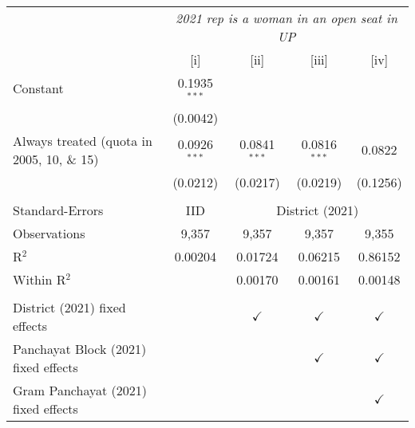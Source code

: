 
\begingroup
\centering
\begin{tabular}{lcccc}
   \toprule
    & \multicolumn{4}{c}{\textit{2021 rep is a woman in an open seat in UP}}\\
                                              & [i]            & [ii]           & [iii]          & [iv]\\  
   \midrule 
   Constant                                   & 0.1935$^{***}$ &                &                &   \\   
                                              & (0.0042)       &                &                &   \\   
   Always treated (quota in 2005, 10, \& 15)  & 0.0926$^{***}$ & 0.0841$^{***}$ & 0.0816$^{***}$ & 0.0822\\   
                                              & (0.0212)       & (0.0217)       & (0.0219)       & (0.1256)\\   
    \\
   Standard-Errors & IID & \multicolumn{3}{c}{District (2021)} \\ 
   Observations                               & 9,357          & 9,357          & 9,357          & 9,355\\  
   R$^2$                                      & 0.00204        & 0.01724        & 0.06215        & 0.86152\\  
   Within R$^2$                               &                & 0.00170        & 0.00161        & 0.00148\\  
    \\
   District (2021) fixed effects              &                & $\checkmark$   & $\checkmark$   & $\checkmark$\\   
   Panchayat Block (2021) fixed effects       &                &                & $\checkmark$   & $\checkmark$\\   
   Gram Panchayat (2021) fixed effects        &                &                &                & $\checkmark$\\   
   \bottomrule
\end{tabular}
\par\endgroup


